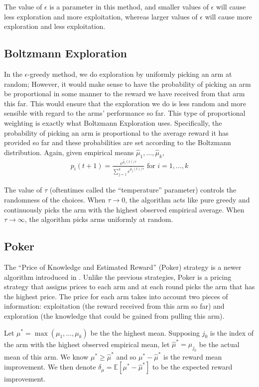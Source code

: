 \documentclass[12pt]{article}
\begin{document}
The value of $\epsilon$ is a parameter in this method, and smaller values of $\epsilon$ will cause less exploration and more exploitation, whereas
larger values of $\epsilon$ will cause more exploration and less exploitation.

\subsection{Boltzmann Exploration}
In the $\epsilon$-greedy method, we do exploration by uniformly picking an arm at random; However, it would make sense to have the probability 
of picking an arm be proportional in some manner to the reward we have received from that arm this far.  This would ensure that the exploration we do 
is less random and more sensible with regard to the arms' performance so far.  This type of proportional weighting is exactly what Boltzmann Exploration 
uses.  Specifically, the probability of picking an arm is proportional to the average reward it has provided so far and these probabilities are 
set according to the Boltzmann distribution.  Again, given empirical means $\hat{\mu}_1, \ldots, \hat{\mu}_k$,
\begin{align*}
p_i(t+1) = \frac{e^{\hat{\mu}_i(t)/\tau}}{\sum_{j=1}^{k} e^{\hat{\mu}_j(t)/\tau}} \, \, \textrm{for } i = 1, \ldots, k
\end{align*}

The value of $\tau$ (oftentimes called the ``temperature'' parameter) controls the randomness of the choices.  When $\tau \to 0$, the algorithm
acts like pure greedy and continuously picks the arm with the highest observed empirical average.  When $\tau \to \infty$, the algorithm picks
arms uniformly at random.

\subsection{Poker}
The ``Price of Knowledge and Estimated Reward'' (Poker) strategy is a newer algorithm introduced in \cite{Mohri}.  Unlike the previous strategies,
Poker is a pricing strategy that assigns prices to each arm and at each round picks the arm that has the highest price.  The price for each arm 
takes into account two pieces of information: exploitation (the reward received from this arm so far) and exploration (the knowledge that could be gained
from pulling this arm).  

Let $\mu^{*} = \max(\mu_1, \ldots, \mu_k)$ be the the highest mean.  Supposing $j_{0}$ is the index of the arm with the highest observed empirical mean, 
let $\hat{\mu}^{*} = \mu_{j_{0}}$ be the actual mean of this arm.
We know $\mu^{*} \ge \hat{\mu}^{*}$ and so $\mu^{*} - \hat{\mu}^{*}$ is the reward mean improvement.  We then denote 
$\delta_{\mu} = \mathbb{E}[\mu^{*} - \hat{\mu}^{*}]$ to be the expected reward improvement.
\end{document}
